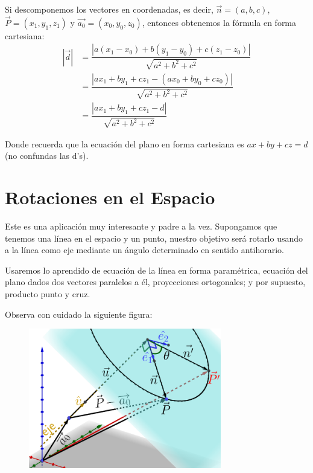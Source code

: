 \documentclass[12pt, fleqn]{report}                             %
\newenvironment{MultiLineEquation}[1]                           %
        {\begin{equation}\begin{alignedat}{#1}}                     %
        {\end{alignedat}\end{equation}}                             %
\theoremstyle{break}                                            %
\newcommand{\abs}[1]{\left\lvert #1 \right\lvert}               %
\newcommand{\lVec}[1]{\overrightarrow{#1}}                      %
\begin{document}
                Si descomponemos los vectores en coordenadas, es decir, 
                $\vec{n} = (a,b,c)$, $\vec{P} = (x_1, y_1, z_1)$ y $\lVec{a_0}=(x_0, y_0, z_0)$,
                entonces obtenemos la fórmula en forma cartesiana:
                \begin{MultiLineEquation}{3}
                    \abs{\vec{d}}
                        &= \dfrac{\abs{a(x_1 - x_0) + b(y_1 - y_0) + c(z_1 - z_0)}}{\sqrt{a^2+b^2+c^2}} \\
                        &= \dfrac{\abs{ax_1 + by_1 + cz_1 - (ax_0 + by_0 + cz_0)}}{\sqrt{a^2+b^2+c^2}}  \\
                        &= \dfrac{\abs{ax_1 + by_1 + cz_1 - d}}{\sqrt{a^2+b^2+c^2}}
                        \label{distancePointPlane2}
                \end{MultiLineEquation}

                Donde recuerda que la ecuación del plano en forma cartesiana es 
                $ax + by + cz = d$ (no confundas las d's).
                


        \clearpage
        \section{Rotaciones en el Espacio}
            
            Este es una aplicación muy interesante y padre a la vez.
            Supongamos que tenemos una línea en el espacio y un punto, nuestro objetivo será rotarlo
            usando a la línea como eje mediante un ángulo determinado en sentido antihorario.
            
            Usaremos lo aprendido de ecuación de la línea en forma paramétrica, ecuación del plano dados
            dos vectores paralelos a él, proyecciones ortogonales; y por supuesto, producto punto y cruz.
            
            Observa con cuidado la siguiente figura:
            \begin{figure}[H]
                \centering
                \includegraphics[width=0.75\textwidth]{rotation}
            \end{figure}
        
\end{document}
